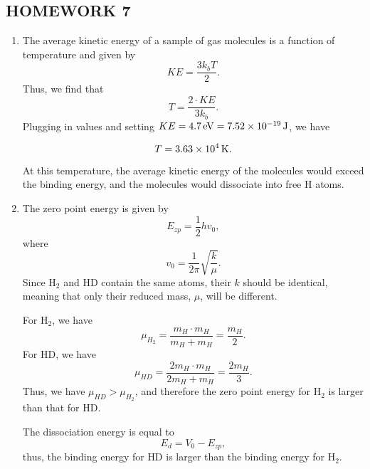 \documentclass[10pt]{article}
\begin{document}

\begin{centering}
  \section*{HOMEWORK 7}
\end{centering}

\begin{enumerate}
\item 
  The average kinetic energy of a sample of gas molecules is a function of temperature and given by 
  \[
    KE = \frac{3 k_b T}{2}
  .\]
  Thus, we find that 
  \[
    T = \frac{2 \cdot KE}{3 k_b}
  .\]
  Plugging in values and setting $ KE = \qty{4.7}{\electronvolt} = \qty{7.52E-19}{\joule} $, we have
  
 \[
   T = \qty{3.63E4}{\kelvin}
 .\]

 At this temperature, the average kinetic energy of the molecules would exceed the binding energy, and the molecules would dissociate into free H atoms.
 
\item 
  The zero point energy is given by 
  \[
    E_{zp} = \frac{1}{2} h v_0
  ,\]
  where 
  \[
    v_0 = \frac{1}{2\pi} \sqrt{\frac{k}{\mu}}
  .\]
  Since $ \text{H}_2 $ and $ \text{HD} $ contain the same atoms, their $ k $ should be identical, meaning that only their reduced mass, $ \mu $, will be different.

  For $ \text{H}_2 $, we have 
  \[
    \mu_{H_2} = \frac{m_H \cdot m_H}{m_H + m_H} = \frac{m_H}{2}
  .\]
  For $ \text{HD} $, we have 
  \[
    \mu_{HD} = \frac{2m_H \cdot m_H}{2m_H + m_H} = \frac{2m_H}{3}
  .\]
  Thus, we have $ \mu_{HD} > \mu_{H_2} $, and therefore the zero point energy for $ \text{H}_2 $ is larger than that for $ \text{HD} $.
  
  The dissociation energy is equal to 
  \[
    E_d = V_0 - E_{zp}
  ,\]
  thus, the binding energy for $ \text{HD} $ is larger than the binding energy for $ \text{H}_2 $.


\end{enumerate}
\end{document}
